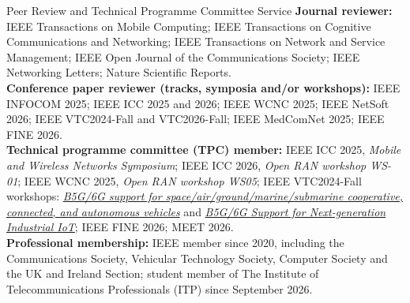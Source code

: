 \documentclass{resume}
\begin{document}
\begin{rSection}{Peer Review and Technical Programme Committee Service}
\textbf{Journal reviewer:} IEEE Transactions on Mobile Computing; IEEE Transactions on Cognitive Communications and Networking; IEEE Transactions on Network and Service Management; IEEE Open Journal of the Communications Society; IEEE Networking Letters; Nature Scientific Reports.\\[2pt]
\textbf{Conference paper reviewer (tracks, symposia and/or workshops):} IEEE INFOCOM 2025; IEEE ICC 2025 and 2026; IEEE WCNC 2025; IEEE NetSoft 2026; IEEE VTC2024-Fall and VTC2026-Fall; IEEE MedComNet 2025; IEEE FINE 2026.\\[2pt]
\textbf{Technical programme committee (TPC) member:} IEEE ICC 2025, \textit{Mobile and Wireless Networks Symposium}; IEEE ICC 2026, \textit{Open RAN workshop WS-01}; IEEE WCNC 2025, \textit{Open RAN workshop WS05}; IEEE VTC2024-Fall workshops: \href{https://sites.google.com/view/vtc2024-fall-ccavs/workshop-committee}{\textit{B5G/6G support for space/air/ground/marine/submarine cooperative, connected, and autonomous vehicles}} and \href{https://sites.google.com/view/vtc2024-fall-iiots/workshop-committee}{\textit{B5G/6G Support for Next-generation Industrial IoT}}; IEEE FINE 2026; MEET 2026.\\[2pt]
\textbf{Professional membership:} IEEE member since 2020, including the Communications Society, Vehicular Technology Society, Computer Society and the UK and Ireland Section; student member of The Institute of Telecommunications Professionals (ITP) since September 2026.
\end{rSection}
\end{document}

